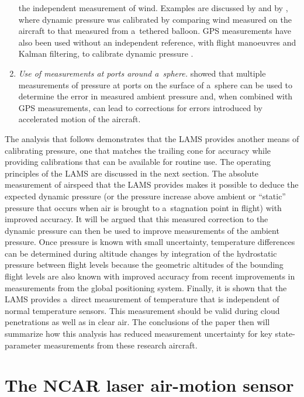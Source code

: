 \documentclass[amtd, online, hvmath]{copernicus}
\begin{document}
\begin{enumerate}
  the independent measurement of wind. Examples are discussed by
  \citet{FosterCunningham2010} and by \citet{MartosEtAl2011}, where
  dynamic pressure was calibrated by comparing wind measured on the
  aircraft to that measured from a~tethered balloon. GPS measurements
  have also been used without an independent reference, with flight
  manoeuvres and Kalman filtering, to calibrate dynamic pressure
  \citep{ISI:000286931800009}.
\item \textit{Use of measurements at ports around a~sphere.}
  \citet{RodiLeon2012} showed that multiple measurements of pressure
  at ports on the surface of a~sphere can be used to determine the
  error in measured ambient pressure and, when combined with GPS
  measurements, can lead to corrections for errors introduced by
  accelerated motion of the aircraft.
\end{enumerate}
The analysis that follows demonstrates that the LAMS provides another
means of calibrating pressure, one that matches the trailing cone for
accuracy while providing calibrations that can be available for
routine use. The operating principles of the LAMS are discussed in the
next section. The absolute measurement of airspeed that the LAMS
provides makes it possible to deduce the expected dynamic pressure (or
the pressure increase above ambient or ``static'' pressure that occurs
when air is brought to a~stagnation point in flight) with improved
accuracy. It will be argued that this measured correction to the
dynamic pressure can then be used to improve measurements of the
ambient pressure.  Once pressure is known with small uncertainty,
temperature differences can be determined during altitude changes by
integration of the hydrostatic pressure between flight levels because
the geometric altitudes of the bounding flight levels are also known
with improved accuracy from recent improvements in measurements from
the global positioning system.  Finally, it is shown that the LAMS
provides a~direct measurement of temperature that is independent of
normal temperature sensors. This measurement should be valid during
cloud penetrations as well as in clear air. The conclusions of the
paper then will summarize how this analysis has reduced measurement
uncertainty for key state-parameter measurements from these research
aircraft.

\section{The NCAR laser air-motion sensor}
\end{document}
